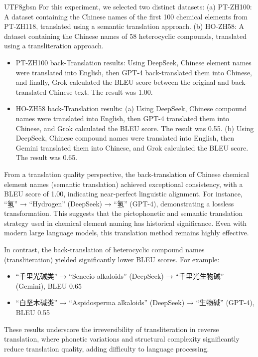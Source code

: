 \documentclass[conference]{IEEEtran}
\begin{document}
\begin{CJK*}{UTF8}{gbsn}
For this experiment, we selected two distinct datasets: (a) PT-ZH100: A dataset containing the Chinese names of the first 100 chemical elements from PT-ZH118, translated using a semantic translation approach. (b) HO-ZH58: A dataset containing the Chinese names of 58 heterocyclic compounds, translated using a transliteration approach.

\begin{itemize}
\item PT-ZH100 back-Translation results: Using DeepSeek, Chinese element names were translated into English, then GPT-4 back-translated them into Chinese, and finally, Grok calculated the BLEU score between the original and back-translated Chinese text. The result was 1.00.
\item HO-ZH58 back-Translation results:
(a) Using DeepSeek, Chinese compound names were translated into English, then GPT-4 translated them into Chinese, and Grok calculated the BLEU score. The result was 0.55.
(b) Using DeepSeek, Chinese compound names were translated into English, then Gemini translated them into Chinese, and Grok calculated the BLEU score. The result was 0.65.
\end{itemize}

From a translation quality perspective, the back-translation of Chinese chemical element names (semantic translation) achieved exceptional consistency, with a BLEU score of 1.00, indicating near-perfect linguistic alignment. For instance, “氢” → “Hydrogen” (DeepSeek) → “氢” (GPT-4), demonstrating a lossless transformation. This suggests that the pictophonetic and semantic translation strategy used in chemical element naming has historical significance. Even with modern large language models, this translation method remains highly effective.

In contrast, the back-translation of heterocyclic compound names (transliteration) yielded significantly lower BLEU scores. For example:
\begin{itemize}  
\item “千里光碱类” → “Senecio alkaloids”  (DeepSeek) → “千里光生物碱” (Gemini), BLEU 0.65
\item “白坚木碱类” → “Aspidosperma alkaloids”  (DeepSeek) → “生物碱” (GPT-4), BLEU 0.55
\end{itemize}

These results underscore the irreversibility of transliteration in reverse translation, where phonetic variations and structural complexity significantly reduce translation quality, adding difficulty to language processing.


\end{CJK*}
\end{document}
